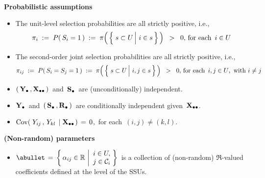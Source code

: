 \vskip 0.2cm
\noindent
\textbf{Probabilistic assumptions}
\begin{itemize}
\item
    The unit-level selection probabilities are all strictly positive, i.e.,
    \begin{equation*}
    \pi_{i}
    \; := \;
        P(\,S_{i} = 1\,)
    \; := \;
        \pi\!\left(\,\left\{\,
            \left.
            s \overset{{\color{white}.}}{\subset} U
            \,\right\vert\,
            i \in s
            \,\right\}
        \,\right)
    \;\; > \;\;
        0,\,
    \textnormal{for each \,$i \in U$\,
    }
    \end{equation*}
\item
    The second-order joint selection probabilities are all strictly positive, i.e.,
    \begin{equation*}
    \pi_{ij}
    \; := \;
        P(\,S_{i} = S_{j} = 1\,)
    \; := \;
        \pi\!\left(\,\left\{\,
            \left.
            s \overset{{\color{white}.}}{\subset} U
            \,\right\vert\,
            i, j \in s
            \,\right\}
        \,\right)
    \;\; > \;\;
        0,\,
    \textnormal{for each \,$i,j \in U$,\, with $i \neq j$}
    \end{equation*}
\item
    $\left(\,\mathbf{Y}_{\bullet}\,,\mathbf{X}_{\bullet\bullet}\,\right)$\, and \,$\mathbf{S}_{\bullet}$\, are (unconditionally) independent.
\item
    $\mathbf{Y}_{\bullet}$\, and \,$(\,\mathbf{S}_{\bullet}\,,\mathbf{R}_{\bullet}\,)$\, are {\color{red}conditionally independent} given \,$\mathbf{X}_{\bullet\bullet}$.
\item
    $\textnormal{Cov}\!\left(\;Y_{ij}\,,\,Y_{kl}\;\left\vert\;\mathbf{X}_{\bullet\bullet}\right.\right) \,=\, 0$,\,
    for each \,$(i,j) \neq (k,l)$.
\end{itemize}

\vskip 0.2cm
\noindent
\textbf{(Non-random) parameters}
\begin{itemize}
\item
    $
    \abullet
    \, = \,
        \left\{\,
            \alpha_{ij} \in \Re
            \,\left\vert
            \begin{array}{c} i \in U, \\ j \in \mathcal{C}_{i} \end{array}
            \right.
            \!\!\right\}
    $\,
    is a collection of (non-random)
    $\Re$-valued coefficients defined at the level of the SSUs.
\end{itemize}


